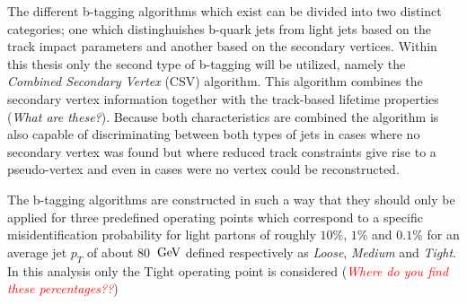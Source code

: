 The different b-tagging algorithms which exist can be divided into two distinct categories; one which distinghuishes b-quark jets from light jets based on the track impact parameters and another based on the secondary vertices. Within this thesis only the second type of b-tagging will be utilized, namely the \textit{Combined Secondary Vertex} (CSV) algorithm. This algorithm combines the secondary vertex information together with the track-based lifetime properties (\textit{What are these?}). Because both characteristics are combined the algorithm is also capable of discriminating between both types of jets in cases where no secondary vertex was found but where reduced track constraints give rise to a pseudo-vertex and even in cases were no vertex could be reconstructed.

The b-tagging algorithms are constructed in such a way that they should only be applied for three predefined operating points which correspond to a specific misidentification probability for light partons of roughly $10 \%$, $1 \%$ and $0.1 \%$ for an average jet $p_T$ of about $80$ $\, \mathrm{GeV}$ defined respectively as \textit{Loose}, \textit{Medium} and \textit{Tight}. In this analysis only the Tight operating point is considered (\textit{\textcolor{red}{Where do you find these percentages??}})




